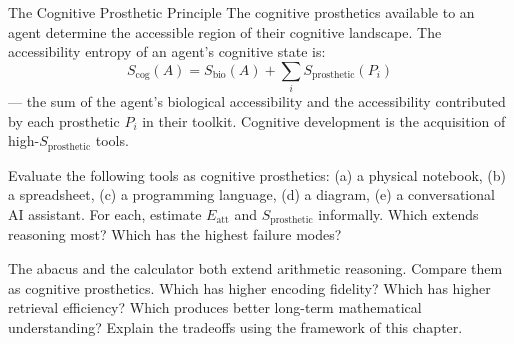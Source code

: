 \begin{namedthm}{The Cognitive Prosthetic Principle}
  The cognitive prosthetics available to an agent determine the
  accessible region of their cognitive landscape. The accessibility
  entropy of an agent's cognitive state is:
  \[
    S_\text{cog}(A) = S_\text{bio}(A) + \sum_i S_\text{prosthetic}(P_i)
  \]
  — the sum of the agent's biological accessibility and the
  accessibility contributed by each prosthetic $P_i$ in their toolkit.
  Cognitive development is the acquisition of high-$S_\text{prosthetic}$
  tools.
\end{namedthm}

\begin{exercise}
  Evaluate the following tools as cognitive prosthetics: (a) a physical
  notebook, (b) a spreadsheet, (c) a programming language,
  (d) a diagram, (e) a conversational AI assistant. For each, estimate
  $E_\text{att}$ and $S_\text{prosthetic}$ informally. Which extends
  reasoning most? Which has the highest failure modes?
\end{exercise}

\begin{exercise}
  The abacus and the calculator both extend arithmetic reasoning.
  Compare them as cognitive prosthetics. Which has higher encoding
  fidelity? Which has higher retrieval efficiency? Which produces
  better long-term mathematical understanding? Explain the tradeoffs
  using the framework of this chapter.
\end{exercise}
